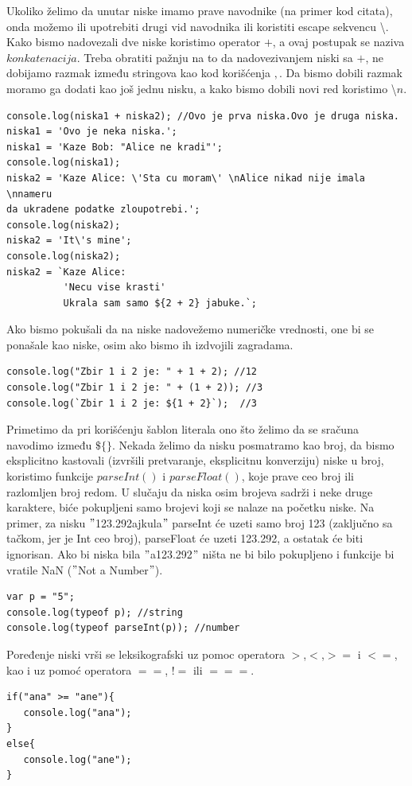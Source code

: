 \documentclass[a4paper]{article}
\begin{document}
Ukoliko želimo da unutar niske imamo prave navodnike (na primer kod citata), onda možemo ili upotrebiti drugi vid navodnika ili koristiti escape sekvencu \textbackslash. Kako bismo nadovezali dve niske koristimo operator $+$, a ovaj postupak se naziva $konkatenacija$. Treba obratiti pažnju na to da nadovezivanjem niski sa $+$, ne dobijamo razmak između stringova kao kod korišćenja $,$. Da bismo dobili razmak moramo ga dodati kao još jednu nisku, a kako bismo dobili novi red koristimo \textbackslash$n$. 
\begin{verbatim}
console.log(niska1 + niska2); //Ovo je prva niska.Ovo je druga niska.
niska1 = 'Ovo je neka niska.';
niska1 = 'Kaze Bob: "Alice ne kradi"';
console.log(niska1);
niska2 = 'Kaze Alice: \'Sta cu moram\' \nAlice nikad nije imala \nnameru
da ukradene podatke zloupotrebi.';
console.log(niska2); 
niska2 = 'It\'s mine';
console.log(niska2);
niska2 = `Kaze Alice:
          'Necu vise krasti'
          Ukrala sam samo ${2 + 2} jabuke.`;
\end{verbatim}
Ako bismo pokušali da na niske nadovežemo numeričke vrednosti, one bi se ponašale kao niske, osim ako bismo ih izdvojili zagradama.
\begin{verbatim}
console.log("Zbir 1 i 2 je: " + 1 + 2); //12
console.log("Zbir 1 i 2 je: " + (1 + 2)); //3
console.log(`Zbir 1 i 2 je: ${1 + 2}`);  //3
\end{verbatim}
Primetimo da pri korišćenju šablon literala ono što želimo da se sračuna navodimo između $\$\{\}$.
Nekada želimo da nisku posmatramo kao broj, da bismo eksplicitno kastovali (izvršili pretvaranje, eksplicitnu konverziju) niske u broj, koristimo funkcije $parseInt()$ i $parseFloat()$, koje prave ceo broj ili razlomljen broj redom. U slučaju da niska osim brojeva sadrži i neke druge karaktere, biće pokupljeni samo brojevi koji se nalaze na početku niske. Na primer, za nisku $"$123.292ajkula$"$ parseInt će uzeti samo broj 123 (zaključno sa tačkom, jer je Int ceo broj), parseFloat će uzeti 123.292, a ostatak će biti ignorisan. Ako bi niska bila $"$a123.292$"$ ništa ne bi bilo pokupljeno i funkcije bi vratile NaN ($"$Not a Number$"$). 
\begin{verbatim}
var p = "5";
console.log(typeof p); //string
console.log(typeof parseInt(p)); //number
\end{verbatim}
Poređenje niski vrši se leksikografski uz pomoc operatora $>$,$<$,$>=$ i $<=$, kao i uz pomoć operatora $==$, $!=$ ili $===$.
\begin{verbatim}
if("ana" >= "ane"){
   console.log("ana");
}
else{
   console.log("ane");
}
\end{verbatim}
\end{document}
